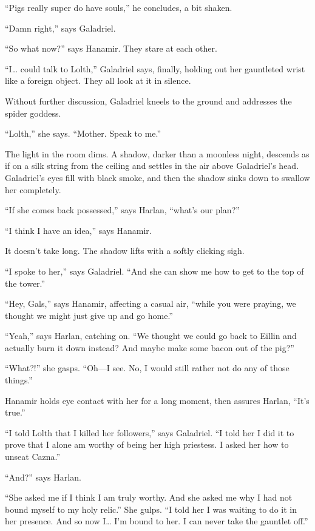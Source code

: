 \documentclass[smalldemyvopaper,11pt,twoside,onecolumn,openright,extrafontsizes]{memoir}
\begin{document}
``Pigs really super do have souls,'' he concludes, a bit shaken.

``Damn right,'' says Galadriel.

``So what now?'' says Hanamir. They stare at each other.

``I\ldots{} could talk to Lolth,'' Galadriel says, finally, holding out
her gauntleted wrist like a foreign object. They all look at it in
silence.

Without further discussion, Galadriel kneels to the ground and addresses
the spider goddess.

``Lolth,'' she says. ``Mother. Speak to me.''

The light in the room dims. A shadow, darker than a moonless night,
descends as if on a silk string from the ceiling and settles in the air
above Galadriel's head. Galadriel's eyes fill with black smoke, and then
the shadow sinks down to swallow her completely.

``If she comes back possessed,'' says Harlan, ``what's our plan?''

``I think I have an idea,'' says Hanamir.

It doesn't take long. The shadow lifts with a softly clicking sigh.

``I spoke to her,'' says Galadriel. ``And she can show me how to get to
the top of the tower.''

``Hey, Gals,'' says Hanamir, affecting a casual air, ``while you were
praying, we thought we might just give up and go home.''

``Yeah,'' says Harlan, catching on. ``We thought we could go back to
Eillin and actually burn it down instead? And maybe make some bacon out
of the pig?''

``What?!'' she gasps. ``Oh---I see. No, I would still rather not do any
of those things.''

Hanamir holds eye contact with her for a long moment, then assures
Harlan, ``It's true.''

``I told Lolth that I killed her followers,'' says Galadriel. ``I told
her I did it to prove that I alone am worthy of being her high
priestess. I asked her how to unseat Cazna.''

``And?'' says Harlan.

``She asked me if I think I am truly worthy. And she asked me why I had
not bound myself to my holy relic.'' She gulps. ``I told her I was
waiting to do it in her presence. And so now I\ldots{} I'm bound to her.
I can never take the gauntlet off.''
\end{document}
